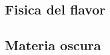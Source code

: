 \documentclass[10pt,a4paper,twoside]{report}
\begin{document}
\begin{comment}
In Belle II è possibile ricercare modelli di nuova fisica che includono specifici accoppiamenti di flavor, la cui ricerca indiretta potrebbe spingere la scala di energia di nuovi meccanismi a livelli anche più alti rispetto alla ricerca diretta, suggerendo inoltre, in quale direzione muoversi per scoprire eventuali nuovi processi. 

Un'importante transizione molto studiata in Belle II è \textit{b}$\rightarrow$\textit{s}. 
Inizialmente la misura di violazione di CP nei sistemi $B_{d}$ è stata fatta usando transizioni a tre livelli del tipo \textit{b}$\rightarrow$\textit{c\bar{c}s}, ad esempio nel golden channel B$\rightarrow$ J/$\psi$$K_{S}^{0}$. Successivamente si è cominciato ad osservare la violazione di CP anche nelle transizioni a loop indotto(??) \textit{b}$\rightarrow$\textit{s}, come B$\rightarrow$ $\phi$$K_{S}^{0}$ oppure B$\rightarrow$ $\eta'$$K_{S}^{0}$. Anche se l'attuale precisione possibile in questi canali, non raggiunge quella dei precedenti.

Nello MS la violazione di CP attesa in queste transizioni è abbastanza piccola, quindi qualsiasi osservazioni significativa potrebbe essere segnale di nuova fisica. 

Un ulteriore indizio di nuova fisica, è stato trovato negli anni passati nella misura del Branching-ratio di B$\rightarrow$ $\nu\tau$, che è una annichilazione a tre livelli del tipo \textit{b}$\rightarrow$\textit{u} e il cui stato finale include almeno due neutrini, per cui una sfida impegnativa dal punto di vista sperimentale.
\end{comment}

\subsection{Fisica del flavor}

\subsection{Materia oscura}















\end{document}
